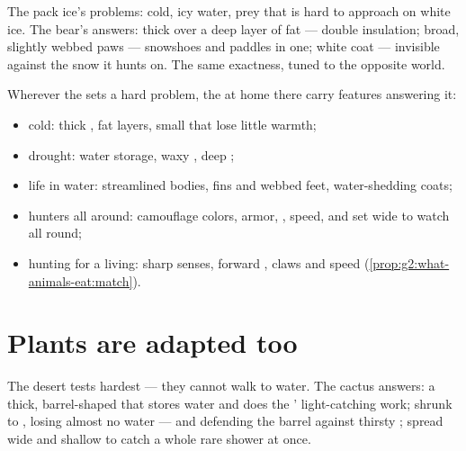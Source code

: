 \begin{example}\label{ex:g4:adapted-to-their-world:bear}
The pack ice's problems: cold, icy water, prey that is hard to
approach on white ice. The bear's answers: thick  over a
deep layer of fat --- double insulation; broad, slightly
webbed paws --- snowshoes and paddles in one; white coat ---
invisible against the snow it hunts on. The same exactness,
tuned to the opposite world.
\end{example}

\begin{proposition}\label{prop:g4:adapted-to-their-world:answers}
Wherever the  sets a hard problem, the  at home there carry features answering it:
\begin{itemize}
  \item cold: thick , fat layers, small  that lose
        little warmth;
  \item drought: water storage, waxy , deep ;
  \item life in water: streamlined bodies, fins and webbed
        feet, water-shedding coats;
  \item hunters all around: camouflage colors, armor, ,
        speed, and  set wide to watch all round;
  \item hunting for a living: sharp senses, forward ,
        claws and speed
        (\cref{prop:g2:what-animals-eat:match}).
\end{itemize}
\end{proposition}
\admitted

\section{Plants are adapted too}

\begin{example}\label{ex:g4:adapted-to-their-world:cactus}
The desert tests  hardest --- they cannot walk to
water. The cactus answers: a thick, barrel-shaped  that
stores water and does the ' light-catching work; 
shrunk to , losing almost no water --- and defending
the barrel against thirsty ;  spread wide and
shallow to catch a whole rare shower at once.
\end{example}

